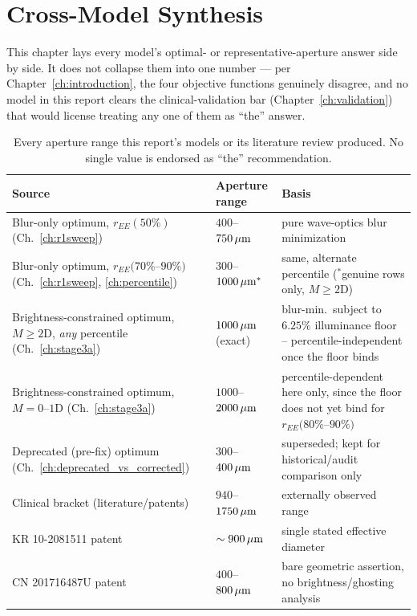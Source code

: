 \chapter{Cross-Model Synthesis}
\label{ch:synthesis}

This chapter lays every model's optimal- or representative-aperture answer side by
side. It does not collapse them into one number --- per Chapter~\ref{ch:introduction},
the four objective functions genuinely disagree, and no model in this report clears
the clinical-validation bar (Chapter~\ref{ch:validation}) that would license treating
any one of them as ``the'' answer.

\begin{table}[htbp]
\centering
\small
\begin{tabular}{lll}
\toprule
Source & Aperture range & Basis \\
\midrule
Blur-only optimum, $r_{EE}(50\%)$ (Ch.~\ref{ch:r1sweep}) & $400$--$750\,\mu\text{m}$ & pure wave-optics blur minimization \\
Blur-only optimum, $r_{EE}(70\%$--$90\%)$ (Ch.~\ref{ch:r1sweep}, \ref{ch:percentile}) & $300$--$1000\,\mu\text{m}^{\ast}$ & same, alternate percentile ($^\ast$genuine rows only, $M\ge2$D) \\
Brightness-constrained optimum, $M\ge2$D, \emph{any} percentile (Ch.~\ref{ch:stage3a}) & $1000\,\mu\text{m}$ (exact) & blur-min.\ subject to $6.25\%$ illuminance floor -- percentile-independent once the floor binds \\
Brightness-constrained optimum, $M{=}0$--$1$D (Ch.~\ref{ch:stage3a}) & $1000$--$2000\,\mu\text{m}$ & percentile-dependent here only, since the floor does not yet bind for $r_{EE}(80\%$--$90\%)$ \\
Deprecated (pre-fix) optimum (Ch.~\ref{ch:deprecated_vs_corrected}) & $300$--$400\,\mu\text{m}$ & superseded; kept for historical/audit comparison only \\
Clinical bracket (literature/patents) & $940$--$1750\,\mu\text{m}$ & externally observed range \\
KR 10-2081511 patent & $\sim900\,\mu\text{m}$ & single stated effective diameter \\
CN 201716487U patent & $400$--$800\,\mu\text{m}$ & bare geometric assertion, no brightness/ghosting analysis \\
\bottomrule
\end{tabular}
\caption{Every aperture range this report's models or its literature review produced. No single value is endorsed as ``the'' recommendation.}
\label{tab:synthesis}
\end{table}

